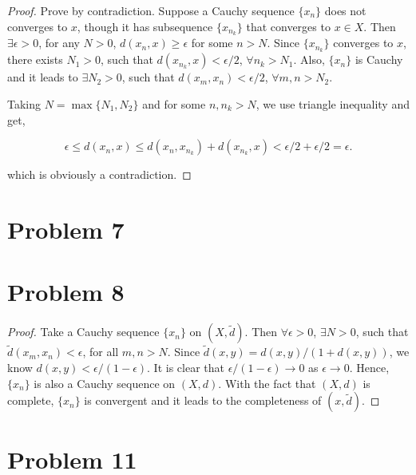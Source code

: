 \documentclass[12pt]{article}
\begin{document}
\begin{proof}

Prove by contradiction. Suppose a Cauchy sequence $\{x_n\}$ does not converges to $x$, though it has subsequence $\{x_{n_k}\}$ that converges to $x\in X$. Then $\exists \epsilon > 0$, for any $N > 0$, $d(x_n, x) \geqslant \epsilon$ for some $n > N$. Since $\{x_{n_k}\}$ converges to $x$, there exists $N_1 > 0$, such that $d(x_{n_k}, x) < \epsilon/2$, $\forall n_k > N_1$. Also, $\{x_n\}$ is Cauchy and it leads to $\exists N_2 > 0$, such that $d(x_m, x_n) <\epsilon/2$, $\forall m, n > N_2$. 

Taking $N = \max\{N_1, N_2\}$ and for some $n, n_k > N$, we use triangle inequality and get,

$$
\epsilon \leqslant d(x_n, x) \leqslant d(x_n, x_{n_k}) + d(x_{n_k}, x) < \epsilon/2 + \epsilon/2 = \epsilon.
$$

which is obviously a contradiction.

\end{proof}


\section*{Problem 7}

\section*{Problem 8}

\begin{proof}

Take a Cauchy sequence $\{x_n\}$ on $(X, \tilde{d})$. Then $\forall \epsilon > 0$, $\exists N > 0$, such that $\tilde d(x_m, x_n) < \epsilon $, for all $m, n > N$. Since $\tilde d(x, y) = d(x, y)/(1+d(x, y))$, we know $d(x, y) < \epsilon / (1-\epsilon)$. It is clear that $\epsilon / (1-\epsilon) \rightarrow 0$ as $\epsilon \rightarrow 0$. Hence, $\{x_n\}$ is also a Cauchy sequence on $(X, d)$. With the fact that $(X, d)$ is complete, $\{x_n\}$ is convergent and it leads to the completeness of $(x, \tilde{d})$.


\end{proof}




\section*{Problem 11}
\end{document}
